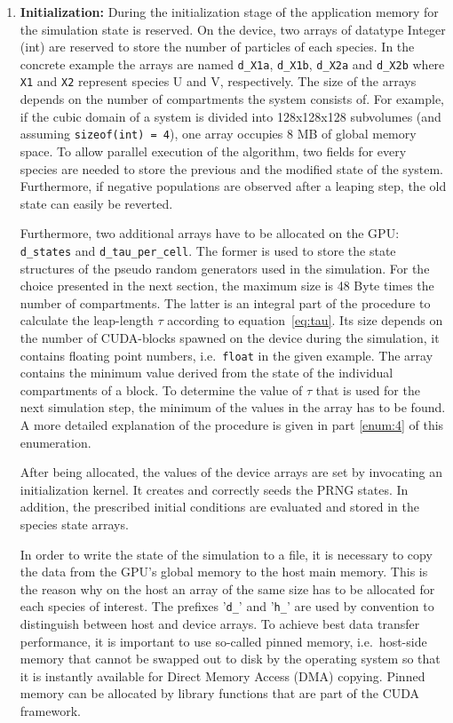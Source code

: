 \begin{enumerate}
\item \textbf{Initialization:} During the initialization stage of the application memory for the simulation state is reserved. On the device, two arrays of datatype Integer (int) are reserved to store the number of particles of each species. In the concrete example the arrays are named \texttt{d\_X1a}, \texttt{d\_X1b}, \texttt{d\_X2a} and \texttt{d\_X2b} where \texttt{X1} and \texttt{X2} represent species U and V, respectively. The size of the arrays depends on the number of compartments the system consists of. For example, if the cubic domain of a system is divided into 128x128x128 subvolumes (and assuming \texttt{sizeof(int) = 4}), one array occupies 8 MB of global memory space. To allow parallel execution of the algorithm, two fields for every species are needed to store the previous and the modified state of the system. Furthermore, if negative populations are observed after a leaping step, the old state can easily be reverted. 

Furthermore, two additional arrays have to be allocated on the GPU: \texttt{d\_states} and \texttt{d\_tau\_per\_cell}. The former is used to store the state structures of the pseudo random generators used in the simulation. For the choice presented in the next section, the maximum size is 48 Byte times the number of compartments. The latter is an integral part of the procedure to calculate the leap-length $\tau$ according to equation~\eqref{eq:tau}. Its size depends on the number of CUDA-blocks spawned on the device during the simulation, it contains floating point numbers, i.e.\ \texttt{float} in the given example. The array contains the minimum value derived from the state of the individual compartments of a block. To determine the value of $\tau$ that is used for the next simulation step, the minimum of the values in the array has to be found. A more detailed explanation of the procedure is given in part \ref{enum:4} of this enumeration. 

After being allocated, the values of the device arrays are set by invocating an initialization kernel. It creates and correctly seeds the PRNG states. In addition, the prescribed initial conditions are evaluated and stored in the species state arrays. 

In order to write the state of the simulation to a file, it is necessary to copy the data from the GPU's global memory to the host main memory. This is the reason why on the host an array of the same size has to be allocated for each species of interest. The prefixes '\texttt{d\_}' and '\texttt{h\_}' are used by convention to distinguish between host and device arrays. To achieve best data transfer performance, it is important to use so-called pinned memory, i.e.\ host-side memory that cannot be swapped out to disk by the operating system so that it is instantly available for Direct Memory Access (DMA) copying. Pinned memory can be allocated by library functions that are part of the CUDA framework. 
\label{enum:init}


\end{enumerate}
